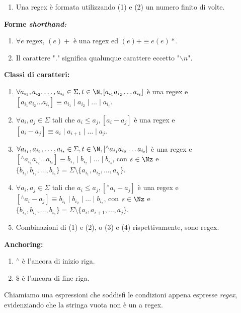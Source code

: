 \begin{definizione}
\begin{enumerate}
		\item Una regex è formata utilizzando (\num{1}) e (\num{2}) un numero finito di volte.
	\end{enumerate}
	\textbf{Forme \textit{shorthand:}}
	\begin{enumerate}
		\item $\forall e$ regex, $(e)+$ è una regex ed $(e)+ \equiv e(e)*$.
		\item Il carattere "." significa qualunque carattere eccetto "$\backslash n$".
	\end{enumerate}
	\textbf{Classi di caratteri:}
	\begin{enumerate}
		\item $\forall a_{i_1}, a_{i_2},\dots, a_{i_t} \in \Sigma, t \in \N, [a_{i_1} a_{i_2} \dots a_{i_t}]$ è una regex e\\
		$[a_{i_1} a_{i_2} \dots a_{i_t}] \equiv a_{i_1} \mid a_{i_2} \mid \dots \mid a_{i_t}$.
		\item $\forall a_i, a_j \in \Sigma$ tali che $a_i \leq a_j, [a_i-a_j]$ è una regex e\\
		$[a_i-a_j] \equiv a_i\mid a_{i+1} \mid \dots \mid a_j$.
		\item $\forall a_{i_1}, a_{i_2},\dots, a_{i_t} \in \Sigma, t \in \N, [^\wedge a_{i_1} a_{i_2} \dots a_{i_t}]$ è una regex e\\
		$[^\wedge a_{i_1} a_{i_2} \dots a_{i_t}] \equiv b_{i_1} \mid b_{i_2} \mid \dots \mid b_{i_s}$, con $s \in \Nz$ e $\{b_{i_1}, b_{i_2}, \dots, b_{i_s} \} = \Sigma \setminus \{ a_{i_1}, a_{i_2},\dots, a_{i_t}\}$.
		\item $\forall a_i, a_j \in \Sigma$ tali che $a_i \leq a_j, [^\wedge a_i-a_j]$ è una regex e $[^\wedge a_i-a_j] \equiv b_{i_1} \mid b_{i_2} \mid \dots \mid b_{i_s}$, con $s \in \Nz$ e $\{b_{i_1}, b_{i_2}, \dots, b_{i_s} \} = \Sigma \setminus \{ a_{i}, a_{i + 1},\dots, a_{j}\}$.
		\item Combinazioni di (\num{1}) e (\num{2}), o (\num{3}) e (\num{4}) rispettivamente, sono regex.
	\end{enumerate}
	\textbf{Anchoring:}
	\begin{enumerate}
		\item $^\wedge$ è l'ancora di inizio riga.
		\item $\$$ è l'ancora di fine riga.
	\end{enumerate}
Chiamiamo una espressioni che soddisfi le condizioni appena espresse \textit{regex}, evidenziando che la stringa vuota non è un a regex.
\end{definizione}

